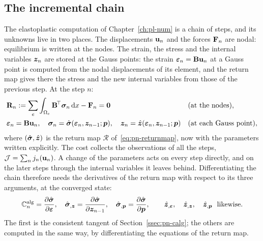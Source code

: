 \subsection{The incremental chain}
The elastoplastic computation of Chapter~\ref{ch:pl-num} is a chain of steps,
and its unknowns live in two places. The displacements $\mathbf{u}_n$ and the
forces $\mathbf{F}_n$ are nodal: equilibrium is written at the nodes. The strain, the
stress and the internal variables $\bm{z}_n$ are stored at the Gauss points: the
strain $\bm{\varepsilon}_n=\mathbf{B}\mathbf{u}_n$ at a Gauss point is computed from the nodal
displacements of its element, and the return map gives there the stress and the
new internal variables from those of the previous step. At the step $n$:
\begin{equation}\label{eq:id-chain}
\begin{aligned}
  &\mathbf{R}_n:=\sum_e\int_{\Omega_e}\mathbf{B}^{\!\top}\bm{\sigma}_n\,\mathrm{d} x-\mathbf{F}_n=\mathbf{0}
  &&\text{(at the nodes)},\\
  &\bm{\varepsilon}_n=\mathbf{B}\mathbf{u}_n,\quad
  \bm{\sigma}_n=\hat{\bm{\sigma}}(\bm{\varepsilon}_n,\bm{z}_{n-1};\bm{p}),\quad
  \bm{z}_n=\hat{\bm{z}}(\bm{\varepsilon}_n,\bm{z}_{n-1};\bm{p})
  &&\text{(at each Gauss point)},
\end{aligned}
\end{equation}
where $(\hat{\bm{\sigma}},\hat{\bm{z}})$ is the return map $\mathcal R$ of~\eqref{eq:pn-returnmap},
now with the parameters written explicitly. The cost collects the observations
of all the steps, $\mathcal J=\sum_nj_n(\mathbf{u}_n)$. A change of the parameters acts on
every step directly, and on the later steps through the internal variables it
leaves behind. Differentiating the chain therefore needs the derivatives of the
return map with respect to its three arguments, at the converged state:
\[
  \bbCalg_n=\frac{\partial\hat\sig}{\partial\eps},\quad
  \hat\sig_{,\vz}=\frac{\partial\hat\sig}{\partial\vz_{n-1}},\quad
  \hat\sig_{,\vp}=\frac{\partial\hat\sig}{\partial\vp},\qquad
  \hat\vz_{,\eps},\quad\hat\vz_{,\vz},\quad\hat\vz_{,\vp}\ \ \text{likewise}.
\]
The first is the consistent tangent of Section~\ref{ssec:pn-calg}; the others are
computed in the same way, by differentiating the equations of the return map.

